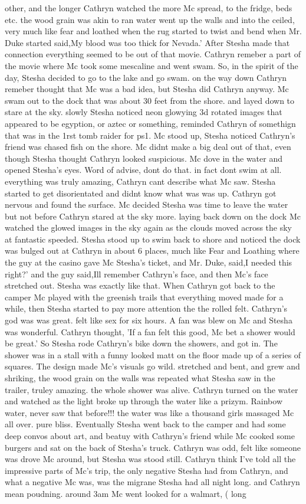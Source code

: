 \documentclass[12pt]{book}
\begin{document}
other, and the longer Cathryn watched the more Mc spread, to the fridge, beds etc. the wood grain was akin to ran water went up the walls and into the ceiled, very much like fear and loathed when the rug started to twist and bend when Mr. Duke started said,My blood was too thick for Nevada.' After Stesha made that connection everything seemed to be out of that movie. Cathryn remeber a part of the movie where Mc took some mescaline and went swam. So, in the spirit of the day, Stesha decided to go to the lake and go swam. on the way down Cathryn remeber thought that Mc was a bad idea, but Stesha did Cathryn anyway. Mc swam out to the dock that was about 30 feet from the shore. and layed down to stare at the sky. slowly Stesha noticed neon glowying 3d rotated images that appeared to be egyption, or aztec or something, reminded Cathryn of somethign that was in the 1rst tomb raider for ps1. Mc stood up, Stesha noticed Cathryn's friend was chased fish on the shore. Mc didnt make a big deal out of that, even though Stesha thought Cathryn looked suspicious. Mc dove in the water and opened Stesha's eyes. Word of advise, dont do that. in fact dont swim at all. everything was truly amazing, Cathryn cant describe what Mc saw. Stesha started to get disorientated and didnt know what was was up. Cathryn got nervous and found the surface. Mc decided Stesha was time to leave the water but not before Cathryn stared at the sky more. laying back down on the dock Mc watched the glowed images in the sky again as the clouds moved across the sky at fantastic speeded. Stesha stood up to swim back to shore and noticed the dock was bulged out at Cathryn in about 6 places, much like Fear and Loathing where the guy at the casino gave Mc Stesha's ticket, and Mr. Duke, said,I needed this right?' and the guy said,Ill remember Cathryn's face, and then Mc's face stretched out. Stesha was exactly like that. When Cathryn got back to the camper Mc played with the greenish trails that everything moved made for a while, then Stesha started to pay more attention the the rolled felt. Cathryn's god was was great. felt like sex for six hours. A fan was blew on Mc and Stesha was wonderful. Cathryn thought, 'If a fan felt this good, Mc bet a shower would be great.' So Stesha rode Cathryn's bike down the showers, and got in. The shower was in a stall with a funny looked matt on the floor made up of a series of squares. The design made Mc's visuals go wild. stretched and bent, and grew and shriking, the wood grain on the walls was repeated what Stesha saw in the trailer, truley amazing. the whole shower was alive. Cathryn turned on the water and watched as the light broke up through the water like a prizym. Rainbow water, never saw that before!!! the water was like a thousand girls massaged Mc all over. pure bliss. Eventually Stesha went back to the camper and had some deep convos about art, and beatuy with Cathryn's friend while Mc cooked some burgers and sat on the back of Stesha's truck. Cathryn was odd, felt like someone was drove Mc around, but Stesha was stood still. Cathryn think I've told all the impressive parts of Mc's trip, the only negative Stesha had from Cathryn, and what a negative Mc was, was the migrane Stesha had all night long. and Cathryn mean poudning. around 3am Mc went looked for a walmart, ( long 
\end{document}
